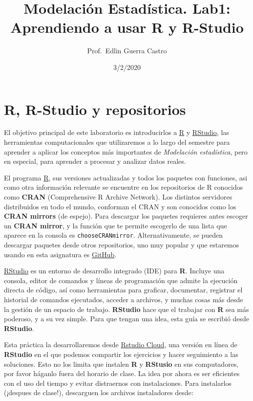 \documentclass[]{article}
\title{Modelación Estadística. Lab1: Aprendiendo a usar R y R-Studio}
\author{Prof.~Edlin Guerra Castro}
\date{3/2/2020}
\begin{document}
\maketitle

\hypertarget{r-r-studio-y-repositorios}{%
\section{R, R-Studio y repositorios}\label{r-r-studio-y-repositorios}}

El objetivo principal de este laboratorio es introducirlos a
\href{https://www.r-project.org/}{R} y
\href{https://rstudio.com/}{RStudio}, las herramientas computacionales
que utilizaremos a lo largo del semestre para aprender a aplicar los
conceptos más importantes de \emph{Modelación estadística}, pero en
especial, para aprender a procesar y analizar datos reales.

El programa \href{https://www.r-project.org/}{R}, sus versiones
actualizadas y todos los paquetes con funciones, asi como otra
información relevante se encuentre en los repositorios de R conocidos
como \textbf{CRAN} (Comprehensive R Archive Network). Los distintos
servidores distribuidos en todo el mundo, conforman el CRAN y son
conocidos como los \textbf{CRAN mirrors} (de espejo). Para descargar los
paquetes requieres antes escoger un \textbf{CRAN mirror}, y la función
que te permite escogerlo de una lista que aparece en la consola es
\texttt{chooseCRANmirror}. Alternativamente, se pueden descargar
paquetes desde otros repositorios, uno muy popular y que estaremos
usando en esta asignatura es \href{https://github.com/}{GitHub}.

\href{https://rstudio.com/}{RStudio} es un entorno de desarrollo
integrado (IDE) para \textbf{R}. Incluye una consola, editor de comandos
y líneas de programación que admite la ejecución directa de código, así
como herramientas para graficar, documentar, registrar el historial de
comandos ejecutados, acceder a archivos, y muchas cosas más desde la
gestión de un espacio de trabajo. \textbf{RStudio} hace que el trabajar
con \textbf{R} sea más poderoso, y a su vez simple. Para que tengan una
idea, esta guía se escribió desde \textbf{RStudio}.

Esta práctica la desarrollaremos desde
\href{https://rstudio.cloud/}{Rstudio Cloud}, una versión en línea de
\textbf{RStudio} en el que podemos compartir los ejercicios y hacer
seguimiento a las soluciones. Esto no los limita que instalen \textbf{R}
y \textbf{RStusio} en sus computadores, por favor háganlo fuera del
horario de clase. La idea por ahora es ser eficientes con el uso del
tiempo y evitar distraernos con instalaciones. Para instalarlos
(¡despues de clase!), descarguen los archivos instaladores desde:
\end{document}
